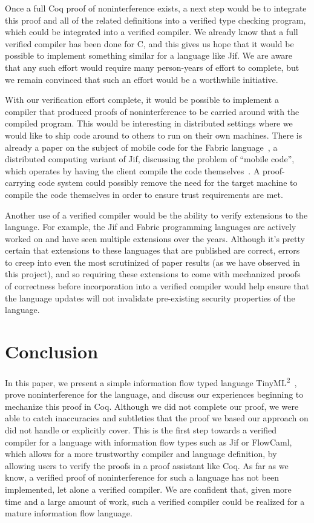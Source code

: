 \documentclass[a4paper,twocolumn]{article}
\newcommand{\langName}[0]{TinyML\textsuperscript{2}~}
\theoremstyle{plain}
\theoremstyle{definition}
\begin{document}
Once a full Coq proof of noninterference exists, a next step would be to
integrate this proof and all of the related definitions into a verified type
checking program, which could be integrated into a verified compiler.  We
already know that a full verified compiler has been done for C, and this gives
us hope that it would be possible to implement something similar for a language
like Jif.  We are aware that any such effort would require many person-years of effort to complete, but we remain convinced that such an effort would be a worthwhile initiative.

With our verification effort complete, it would be possible to implement
a compiler that produced proofs of noninterference to be carried around with the
compiled program.  This would be interesting in distributed settings where we
would like to ship code around to others to run on their own machines.  There is
already a paper on the subject of mobile code for the Fabric
language~\cite{liu2009fabric}, a distributed computing variant of Jif,
discussing the problem of ``mobile code'', which operates by having the client
compile the code themselves~\cite{arden2012sharing}.  A proof-carrying code
system could possibly remove the need for the target machine to compile the code
themselves in order to ensure trust requirements are met.

Another use of a verified compiler would be the ability to verify extensions to
the language.  For example, the Jif and Fabric programming languages are
actively worked on and have seen multiple extensions over the years.  Although
it's pretty certain that extensions to these languages that are published are
correct, errors to creep into even the most scrutinized of paper results (as we
have observed in this project), and so requiring these extensions to come with
mechanized proofs of correctness before incorporation into a verified compiler
would help ensure that the language updates will not invalidate pre-existing
security properties of the language.

\section{Conclusion}
\label{sec:conclusion}

In this paper, we present a simple information flow typed language \langName,
prove noninterference for the language, and discuss our experiences beginning to
mechanize this proof in Coq.  Although we did not complete our proof, we were
able to catch inaccuracies and subtleties that the proof we based our approach
on did not handle or explicitly cover.  This is the first step towards a
verified compiler for a language with information flow types such as Jif or
FlowCaml, which allows for a more trustworthy compiler and language definition,
by allowing users to verify the proofs in a proof assistant like Coq.  As far as
we know, a verified proof of noninterference for such a language has not been
implemented, let alone a verified compiler.  We are confident that, given more
time and a large amount of work, such a verified compiler could be realized for
a mature information flow language.
\end{document}
